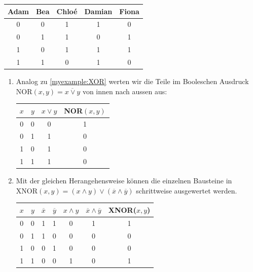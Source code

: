 {\begin{myanswer}
\begin{center}
            \begin{tabular}{ |c|c|c|c|c| } 
            \hline
            Adam & Bea & Chloé & Damian & Fiona \\ 
            \hline
            0 & 0 & 1 & 1 & 0\\ 
            0 & 1 & 1 & 0 & 1\\
            1 & 0 & 1 & 1 & 1\\
            1 & 1 & 0 & 1 & 0\\ 
            \hline
            \end{tabular}
        \end{center}
    \end{myanswer}

    \begin{myanswer}
        \begin{enumerate}
    \item Analog zu \cref{myexample:XOR} werten wir die Teile im Booleschen Ausdruck $\mathrm{NOR}(x,y) = \overline{x\vee y}$ von innen nach aussen aus:\\
        \begin{tabular}{c|c||c||c} 
            $x$ & $y$ & $x\vee y$ & NOR$(x, y)$ \\
            \hline
            0 & 0 &0& 1 \\
            0&1&1&0 \\
            1&0&1&0\\
            1&1&1&0
        \end{tabular}
        \vspace{\baselineskip}
    \item Mit der gleichen Herangehensweise können die einzelnen Bausteine in $\mathrm{XNOR}(x,y) = (x\wedge y) \vee (\overline{x} \wedge \overline{y})$ schrittweise ausgewertet werden.\\
        \begin{tabular}{c|c||c|c| c |c || c}
            $x$ & $y$ & $\overline{x}$ & $\overline{y}$ & $x\wedge y$ & $\overline{x} \wedge \overline{y}$ & XNOR($x, y$) \\
            \hline
            0&0&1&1&0&1&1 \\
            0&1&1&0&0&0&0 \\
            1&0&0&1&0&0&0 \\
            1&1&0&0&1&0&1 \\
        \end{tabular}
        \vspace{\baselineskip}

\end{enumerate}
\end{myanswer}}
